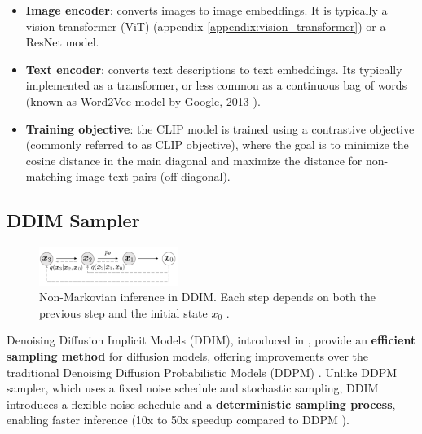 \begin{itemize}
    \item \textbf{Image encoder}: converts images to image embeddings. It is typically a vision transformer (ViT) \cite{vision_transformer} (appendix \ref{appendix:vision_transformer}) or a ResNet \cite{resnet} model.
    \item \textbf{Text encoder}: converts text descriptions to text embeddings. Its typically implemented as a transformer, or less common as a continuous bag of words \cite{cbow_word2vec} (known as Word2Vec model by Google, 2013 \cite{cbow_word2vec}).
    \item \textbf{Training objective}: the CLIP model is trained using a contrastive objective (commonly referred to as CLIP objective), where the goal is to minimize the cosine distance in the main diagonal and maximize the distance for non-matching image-text pairs (off diagonal).
\end{itemize}





















\subsection{DDIM Sampler}
\label{subsec:ddim_sampler}

\begin{figure}[ht]
    \centering
    \includegraphics[width=0.4\textwidth]{images/diffusion_models/stable_diffusion/ddim_non_markov_process.png}
    \caption{Non-Markovian inference in DDIM. Each step depends on both the previous step and the initial state $x_0$ \cite{ddim}.}
    \label{fig:ddim_non_markov_process}
\end{figure}

Denoising Diffusion Implicit Models (DDIM), introduced in \cite{ddim}, provide an \textbf{efficient sampling method} for diffusion models, offering improvements over the traditional Denoising Diffusion Probabilistic Models (DDPM) \cite{ddpm}. Unlike DDPM sampler, which uses a fixed noise schedule and stochastic sampling, DDIM introduces a flexible noise schedule and a \textbf{deterministic sampling process}, enabling faster inference (10x to 50x speedup compared to DDPM \cite{ddim}).

